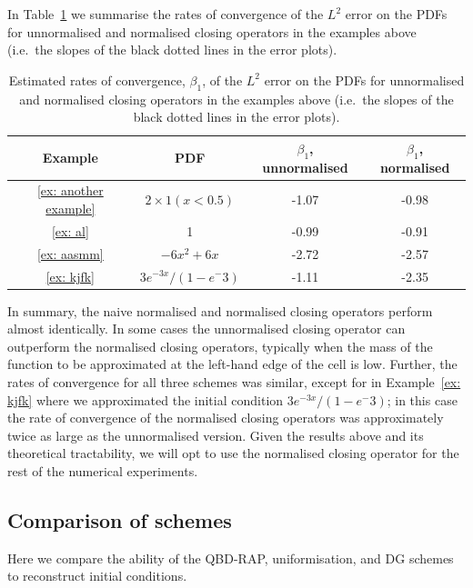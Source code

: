 In Table~\ref{table: error rates for QBD-RAP closing} we summarise the rates of convergence of the \(L^2\) error on the PDFs for unnormalised and normalised closing operators in the examples above (i.e.~the slopes of the black dotted lines in the error plots).
\begin{table}
	\centering
	\begin{tabular}{c|c|c|c}
			Example & PDF & \(\beta_1\), unnormalised & \(\beta_1\), normalised \\\hline
			\ref{ex: another example} & \(2\times 1(x<0.5)\) & -1.07 & -0.98 \\
			\ref{ex: al} & 1 & -0.99 & -0.91 \\
			\ref{ex: aasmm} & \(-6x^2+6x\) & -2.72 & -2.57 \\ 
			\ref{ex: kjfk} & \(3e^{-3x}/(1-e^-3)\) & -1.11 & -2.35 
	\end{tabular}
	\caption{\label{table: error rates for QBD-RAP closing} Estimated rates of convergence, \(\beta_1\), of the \(L^2\) error on the PDFs for unnormalised and normalised closing operators in the examples above (i.e.~the slopes of the black dotted lines in the error plots).}
\end{table} 

In summary, the naive normalised and normalised closing operators perform almost identically. In some cases the unnormalised closing operator can outperform the normalised closing operators, typically when the mass of the function to be approximated at the left-hand edge of the cell is low. Further, the rates of convergence for all three schemes was similar, except for in Example~\ref{ex: kjfk} where we approximated the initial condition \(3e^{-3x}/(1-e^-3)\); in this case the rate of convergence of the normalised closing operators was approximately twice as large as the unnormalised version. Given the results above and its theoretical tractability, we will opt to use the normalised closing operator for the rest of the numerical experiments.

\FloatBarrier
\subsection{Comparison of schemes}\label{sec: comp}
Here we compare the ability of the QBD-RAP, uniformisation, and DG schemes to reconstruct initial conditions. 

